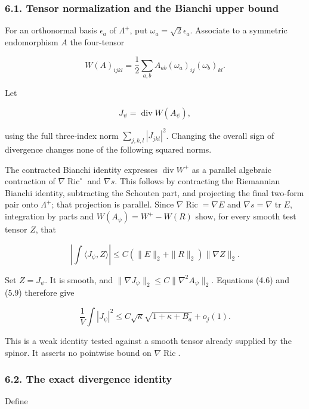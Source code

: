 \documentclass[
  10pt,
]{article}
\begin{document}
\hypertarget{tensor-normalization-and-the-bianchi-upper-bound}{%
\subsubsection{6.1. Tensor normalization and the Bianchi upper
bound}\label{tensor-normalization-and-the-bianchi-upper-bound}}

For an orthonormal basis \(\epsilon_a\) of \(\Lambda^+\), put
\(\omega_a=\sqrt2\epsilon_a\). Associate to a symmetric endomorphism
\(A\) the four-tensor

\[
 W(A)_{ijkl}=\frac12\sum_{a,b}A_{ab}(\omega_a)_{ij}(\omega_b)_{kl}.
 \tag{6.1}
\]

Let

\[
                    J_\psi=\operatorname{div}W(A_\psi),
\]

using the full three-index norm \(\sum_{j,k,l}|J_{jkl}|^2\). Changing
the overall sign of divergence changes none of the following squared
norms.

The contracted Bianchi identity expresses \(\operatorname{div}W^+\) as a
parallel algebraic contraction of \(\nabla\operatorname{Ric}^\circ\) and
\(\nabla s\). This follows by contracting the Riemannian Bianchi
identity, subtracting the Schouten part, and projecting the final
two-form pair onto \(\Lambda^+\); that projection is parallel. Since
\(\nabla\operatorname{Ric}=\nabla E\) and
\(\nabla s=\nabla\operatorname{tr}E\), integration by parts and
\(W(A_\psi)=W^+-W(R)\) show, for every smooth test tensor \(Z\), that

\[
 \left|\int\langle J_\psi,Z\rangle\right|
       \le C(\|E\|_2+\|R\|_2)\|\nabla Z\|_2.
 \tag{6.2}
\]

Set \(Z=J_\psi\). It is smooth, and
\(\|\nabla J_\psi\|_2\le C\|\nabla^2A_\psi\|_2\). Equations (4.6) and
(5.9) therefore give

\[
 \frac1V\int|J_\psi|^2
            \le C\sqrt\kappa\sqrt{1+\kappa+B_a}+o_j(1).
 \tag{6.3}
\]

This is a weak identity tested against a smooth tensor already supplied
by the spinor. It asserts no pointwise bound on
\(\nabla\operatorname{Ric}\).

\hypertarget{the-exact-divergence-identity}{%
\subsubsection{6.2. The exact divergence
identity}\label{the-exact-divergence-identity}}

Define
\end{document}
